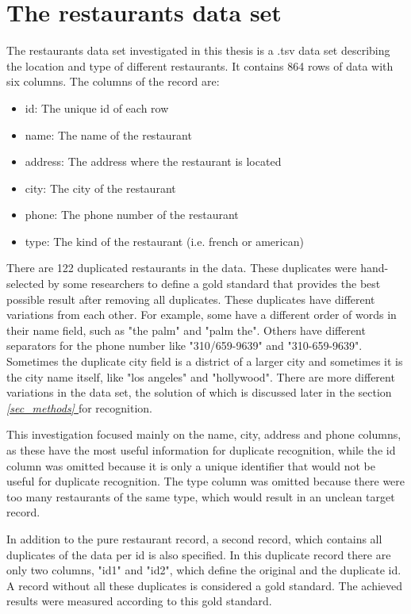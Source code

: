 \documentclass[conference]{IEEEtran}
\newcommand*{\fullref}[1]{\textit{\hyperref[{#1}]{\autoref*{#1} \nameref*{#1}}}}
\begin{document}
\section{The restaurants data set} \label{sec:dataset}
The restaurants data set investigated in this thesis is a .tsv data set describing the location and type of different restaurants. It contains 864 rows of data with six columns. The columns of the record are: 
\begin{itemize}
	\item id: The unique id of each row
	\item name: The name of the restaurant
	\item address: The address where the restaurant is located
	\item city: The city of the restaurant
	\item phone: The phone number of the restaurant
	\item type: The kind of the restaurant (i.e. french or american)
\end{itemize}
There are 122 duplicated restaurants in the data. These duplicates were hand-selected by some researchers to define a gold standard that provides the best possible result after removing all duplicates\cite{bib:reach_for_gold}. These duplicates have different variations from each other. For example, some have a different order of words in their name field, such as "the palm" and "palm the". Others have different separators for the phone number like "310/659-9639" and "310-659-9639". Sometimes the duplicate city field is a district of a larger city and sometimes it is the city name itself, like "los angeles" and "hollywood". There are more different variations in the data set, the solution of which is discussed later in the section \fullref{sec_methods} for recognition.

This investigation focused mainly on the name, city, address and phone columns, as these have the most useful information for duplicate recognition, while the id column was omitted because it is only a unique identifier that would not be useful for duplicate recognition. The type column was omitted because there were too many restaurants of the same type, which would result in an unclean target record.

In addition to the pure restaurant record, a second record, which contains all duplicates of the data per id is also specified. In this duplicate record there are only two columns, "id1" and "id2", which define the original and the duplicate id. A record without all these duplicates is considered a gold standard. The achieved results were measured according to this gold standard.
\end{document}
